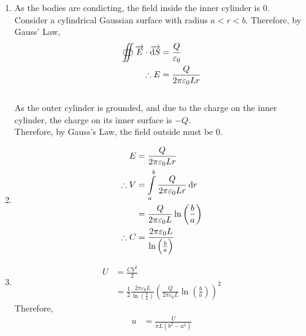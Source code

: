 \documentclass[fleqn, a4paper, 12pt, twoside]{article}
\theoremstyle{definition}
\theoremstyle{theorem}
\begin{document}
\begin{solution}
	\begin{enumerate}[leftmargin=*]
		\item
			As the bodies are condicting, the field inside the inner cylinder is $0$.
			~\\
			Consider a cylindrical Gaussian surface with radius $a < r < b$.
			Therefore, by Gauss' Law,
			\begin{align*}
				\oiint \overrightarrow{E} \cdot \overrightarrow{\dif S} & = \frac{Q}{\varepsilon_0} \\
				\therefore E                                            & = \frac{Q}{2 \pi \varepsilon_0 L r}
			\end{align*}
			~\\
			As the outer cylinder is grounded, and due to the charge on the inner cylinder, the charge on its inner surface is $-Q$.\\
			Therefore, by Gauss's Law, the field outside must be $0$.
		\item
			\begin{align*}
				E &= \frac{Q}{2 \pi \varepsilon_0 L r}\\
				\therefore V &= \int\limits_{a}^{b} \frac{Q}{2 \pi \varepsilon_0 L r} \dif r\\
				&= \frac{Q}{2 \pi \varepsilon_0 L} \ln \left( \frac{b}{a} \right)\\
				\therefore C &= \frac{2 \pi \varepsilon_0 L}{\ln \left( \frac{b}{a} \right)}
			\end{align*}
		\item
			\begin{align*}
				U &= \frac{C V^2}{2}\\
				&= \frac{1}{2} \frac{2 \pi \varepsilon_0 L}{\ln \left( \frac{b}{a} \right)} \left( \frac{Q}{2 \pi \varepsilon_0 L} \ln \left( \frac{b}{a} \right) \right)^2
			\end{align*}
			Therefore,
			\begin{align*}
				u &= \frac{U}{\pi L (b^2 - a^2)}
			\end{align*}
	\end{enumerate}
\end{solution}
\end{document}

